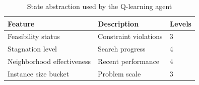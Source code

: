 \begin{table}[ht]
\centering
\caption{State abstraction used by the Q-learning agent}
\label{tab:qlearning_state}

\begin{tabular}{lll}
\hline
Feature & Description & Levels\\
\hline
Feasibility status & Constraint violations & 3\\
Stagnation level & Search progress & 4\\
Neighborhood effectiveness & Recent performance & 4\\
Instance size bucket & Problem scale & 3\\
\hline
\end{tabular}

\end{table}